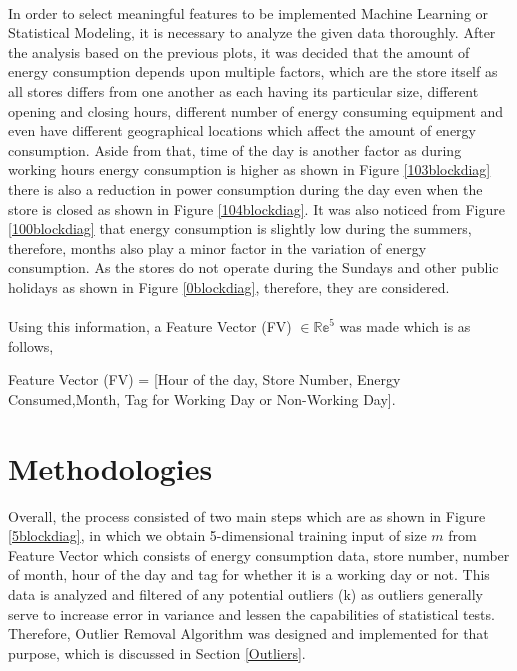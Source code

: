 \documentclass[12pt]{article}
\begin{document}
\paragraph{}In order to select meaningful features to be implemented Machine Learning or Statistical Modeling, it is necessary to analyze the given data thoroughly.  After the analysis based on the previous plots, it was decided that the amount of energy consumption depends upon multiple factors, which are the store itself as all stores differs from one another as each having its particular size, different opening and closing hours, different number of energy consuming equipment and even have different geographical locations which affect the amount of energy consumption. Aside from that, time of the day is another factor as during working hours energy consumption is higher as shown in Figure \ref{103blockdiag} there is also a reduction in power consumption during the day even when the store is closed as shown in Figure \ref{104blockdiag}. It was also noticed from Figure \ref{100blockdiag} that energy consumption is slightly low during the summers, therefore, months also play a minor factor in the variation of energy consumption. As the stores do not operate during the Sundays and other public holidays as shown in Figure \ref{0blockdiag}, therefore, they are considered.

\paragraph{} Using this information, a Feature Vector (FV) $\in \mathbb{Re}^5 $ was made which is as follows,

Feature Vector (FV) = [Hour of the day, Store Number, Energy Consumed,Month, Tag for Working Day or Non-Working Day].





\paragraph{} 





\section{Methodologies}

Overall, the process consisted of two main steps which are as shown in Figure \ref{5blockdiag}, in which we obtain 5-dimensional  training input of size $m$ from Feature Vector which consists of energy consumption data, store number, number of month, hour of the day and tag for whether it is a working day or not. This data is analyzed and filtered of any potential outliers (k) as outliers generally serve to increase error in variance and lessen the capabilities of statistical tests. Therefore, Outlier Removal Algorithm was designed and implemented for that purpose, which is discussed in Section \ref{Outliers}.
\end{document}
